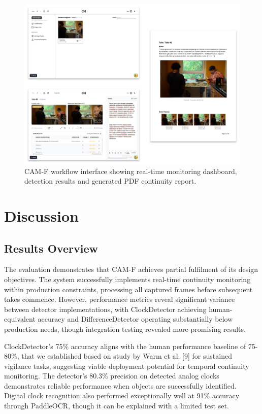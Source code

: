 \begin{figure}[h]
\centering
\includegraphics[width=\textwidth]{figures/app.png}
\caption{CAM-F workflow interface showing real-time monitoring dashboard, detection results and generated PDF continuity report.}
\label{fig:app-interface}
\end{figure}

\section{Discussion}

\subsection{Results Overview}
The evaluation demonstrates that CAM-F achieves partial fulfilment of its design objectives. The system successfully implements real-time continuity monitoring within production constraints, processing all captured frames before subsequent takes commence. However, performance metrics reveal significant variance between detector implementations, with ClockDetector achieving human-equivalent accuracy and DifferenceDetector operating substantially below production needs, though integration testing revealed more promising results.

ClockDetector's 75\% accuracy aligns with the human performance baseline of 75-80\%, that we established based on study by Warm et al. [9] for sustained vigilance tasks, suggesting viable deployment potential for temporal continuity monitoring. The detector's 80.3\% precision on detected analog clocks demonstrates reliable performance when objects are successfully identified. Digital clock recognition also performed exceptionally well at 91\% accuracy through PaddleOCR, though it can be explained with a limited test set.

